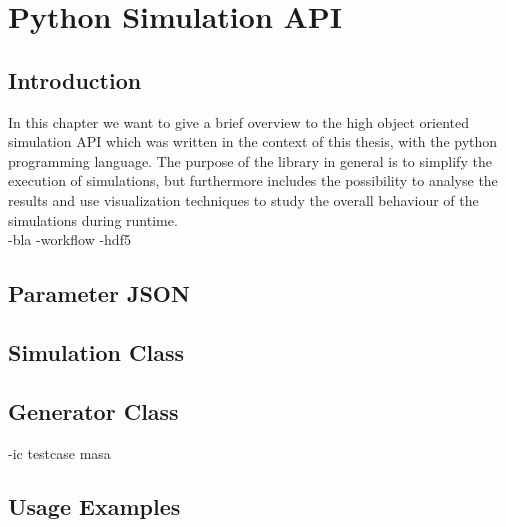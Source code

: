 \chapter{Python Simulation API}

\section{Introduction}

In this chapter we want to give a brief overview to the high object oriented simulation API which
was written in the context of this thesis, with the python programming language.
The purpose of the library in general is to simplify the execution of simulations, but furthermore
includes the possibility to analyse the results and use visualization techniques to study the overall
behaviour of the simulations during runtime.\\


-bla
-workflow
-hdf5



\section{Parameter JSON}
\section{Simulation Class}
\section{Generator Class}
-ic testcase masa
\section{Usage Examples}



